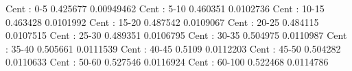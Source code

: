 Cent : 0-5
0.425677 0.00949462
Cent : 5-10
0.460351 0.0102736
Cent : 10-15
0.463428 0.0101992
Cent : 15-20
0.487542 0.0109067
Cent : 20-25
0.484115 0.0107515
Cent : 25-30
0.489351 0.0106795
Cent : 30-35
0.504975 0.0110987
Cent : 35-40
0.505661 0.0111539
Cent : 40-45
0.5109 0.0112203
Cent : 45-50
0.504282 0.0110633
Cent : 50-60
0.527546 0.0116924
Cent : 60-100
0.522468 0.0114786
